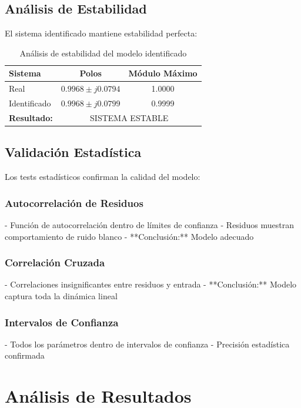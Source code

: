\documentclass[a4paper,openright,9pt]{report}
\begin{document}
\subsection{Análisis de Estabilidad}

El sistema identificado mantiene estabilidad perfecta:

\begin{table}[H]
\centering
\caption{Análisis de estabilidad del modelo identificado}
\label{tab:estabilidad}
\begin{tabular}{@{}lcc@{}}
\toprule
Sistema & Polos & Módulo Máximo \\
\midrule
Real & $0.9968 \pm j0.0794$ & 1.0000 \\
Identificado & $0.9968 \pm j0.0799$ & 0.9999 \\
\midrule
\textbf{Resultado:} & \multicolumn{2}{c}{SISTEMA ESTABLE} \\
\bottomrule
\end{tabular}
\end{table}

\subsection{Validación Estadística}

Los tests estadísticos confirman la calidad del modelo:

\subsubsection{Autocorrelación de Residuos}
- Función de autocorrelación dentro de límites de confianza
- Residuos muestran comportamiento de ruido blanco
- **Conclusión:** Modelo adecuado

\subsubsection{Correlación Cruzada}
- Correlaciones insignificantes entre residuos y entrada
- **Conclusión:** Modelo captura toda la dinámica lineal

\subsubsection{Intervalos de Confianza}
- Todos los parámetros dentro de intervalos de confianza
- Precisión estadística confirmada

\section{Análisis de Resultados}
\end{document}
